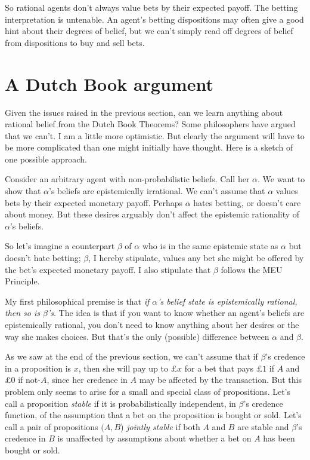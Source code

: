 So rational agents don't always value bets by their expected
payoff. The betting interpretation is untenable. An agent's betting
dispositions may often give a good hint about their degrees of belief,
but we can't simply read off degrees of belief from dispositions to
buy and sell bets.

\section{A Dutch Book argument}


Given the issues raised in the previous section, can we learn anything
about rational belief from the Dutch Book Theorems? Some philosophers
have argued that we can't. I am a little more optimistic. But clearly
the argument will have to be more complicated than one might initially
have thought. Here is a sketch of one possible approach.

Consider an arbitrary agent with non-probabilistic beliefs. Call her
$\alpha$. We want to show that $\alpha$'s beliefs are epistemically
irrational. We can't assume that $\alpha$ values bets by their
expected monetary payoff. Perhaps $\alpha$ hates betting, or doesn't
care about money. But these desires arguably don't affect the
epistemic rationality of $\alpha$'s beliefs. 

So let's imagine a counterpart $\beta$ of $\alpha$ who is in the same
epistemic state as $\alpha$ but doesn't hate betting; $\beta$, I
hereby stipulate, values any bet she might be offered by the bet's
expected monetary payoff. I also stipulate that $\beta$ follows the
MEU Principle.

My first philosophical premise is that \emph{if $\alpha$'s belief
  state is epistemically rational, then so is $\beta$'s}. The idea is
that if you want to know whether an agent's beliefs are epistemically
rational, you don't need to know anything about her desires or the way
she makes choices. But that's the only (possible) difference between
$\alpha$ and $\beta$. 

As we saw at the end of the previous section, we can't assume that if
$\beta$'s credence in a proposition is $x$, then she will pay up to
£$x$ for a bet that pays £$1$ if $A$ and £0 if not-$A$, since her
credence in $A$ may be affected by the transaction. But this problem
only seems to arise for a small and special class of propositions.
Let's call a proposition \emph{stable} if it is probabilistically
independent, in $\beta$'s credence function, of the assumption that a
bet on the proposition is bought or sold. Let's call a pair of
propositions $(A,B$) \emph{jointly stable} if both $A$ and $B$ are
stable and $\beta$'s credence in $B$ is unaffected by assumptions
about whether a bet on $A$ has been bought or sold.

